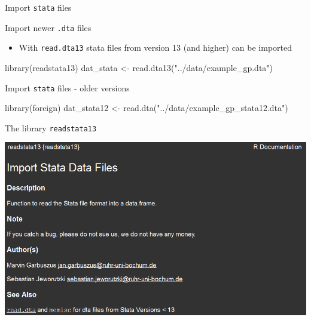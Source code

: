 \documentclass[
  10pt,
  ignorenonframetext,
]{beamer}
\newenvironment{Shaded}{\begin{snugshade}}{\end{snugshade}}
\newcommand{\KeywordTok}[1]{\textcolor[rgb]{0.94,0.87,0.69}{#1}}
\newcommand{\NormalTok}[1]{\textcolor[rgb]{0.80,0.80,0.80}{#1}}
\newcommand{\StringTok}[1]{\textcolor[rgb]{0.80,0.58,0.58}{#1}}
\providecommand{\tightlist}{%
  \setlength{\itemsep}{0pt}\setlength{\parskip}{0pt}}
\begin{document}
\begin{frame}[fragile]{Import \texttt{stata} files}
\protect\hypertarget{import-stata-files}{}

\begin{block}{Import newer \texttt{.dta} files}

\begin{itemize}
\tightlist
\item
  With \texttt{read.dta13} stata files from version 13 (and higher) can
  be imported
\end{itemize}

\begin{Shaded}
\begin{Highlighting}[]
\KeywordTok{library}\NormalTok{(readstata13)}
\NormalTok{dat_stata <-}\StringTok{ }\KeywordTok{read.dta13}\NormalTok{(}\StringTok{"../data/example_gp.dta"}\NormalTok{)}
\end{Highlighting}
\end{Shaded}

\end{block}

\begin{block}{Import \texttt{stata} files - older versions}

\begin{Shaded}
\begin{Highlighting}[]
\KeywordTok{library}\NormalTok{(foreign)}
\NormalTok{dat_stata12 <-}\StringTok{ }\KeywordTok{read.dta}\NormalTok{(}\StringTok{"../data/example_gp_stata12.dta"}\NormalTok{)}
\end{Highlighting}
\end{Shaded}

\end{block}

\end{frame}

\begin{frame}{The library \texttt{readstata13}}
\protect\hypertarget{the-library-readstata13}{}

\includegraphics{figure/readstata13.PNG}

\end{frame}
\end{document}
